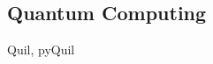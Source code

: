 \documentclass[../Resume.tex]{subfiles}
\begin{document}
    \subsection{Quantum Computing}
        Quil, pyQuil
    \vspace*{-2mm}
\end{document}
